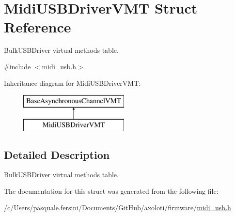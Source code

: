 \hypertarget{structMidiUSBDriverVMT}{}\section{Midi\+U\+S\+B\+Driver\+V\+MT Struct Reference}
\label{structMidiUSBDriverVMT}


{\ttfamily Bulk\+U\+S\+B\+Driver} virtual methods table.  




{\ttfamily \#include $<$midi\+\_\+usb.\+h$>$}

Inheritance diagram for Midi\+U\+S\+B\+Driver\+V\+MT\+:\begin{figure}[H]
\begin{center}
\leavevmode
\includegraphics[height=2.000000cm]{structMidiUSBDriverVMT}
\end{center}
\end{figure}


\subsection{Detailed Description}
{\ttfamily Bulk\+U\+S\+B\+Driver} virtual methods table. 

The documentation for this struct was generated from the following file\+:\begin{DoxyCompactItemize}
\item 
/c/\+Users/pasquale.\+fersini/\+Documents/\+Git\+Hub/axoloti/firmware/\hyperlink{midi__usb_8h}{midi\+\_\+usb.\+h}\end{DoxyCompactItemize}
